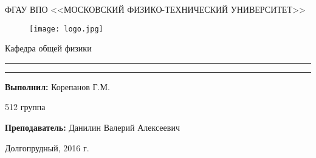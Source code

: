 \begin{titlepage}
\begin{center}\large
ФГАУ ВПО <<МОСКОВСКИЙ ФИЗИКО-ТЕХНИЧЕСКИЙ УНИВЕРСИТЕТ>>
\begin{figure}[H]
\centering
\texttt{[image: logo.jpg]}
\end{figure}
{\Large
Кафедра общей физики}

\vfill

\hrule
\vspace{0.3cm}

\huge \LabTitle

\vspace{0.3cm}
\hrule




\end{center}

\vfill


\begin{minipage}{0.7\textwidth}
\textbf{Выполнил:}
Корепанов Г.М.

512 группа

\vspace{0.5cm}

\textbf{Преподаватель:}
Данилин Валерий Алексеевич
\end{minipage}


\vfill
\centering
 Долгопрудный, 2016 г.




\end{titlepage}

